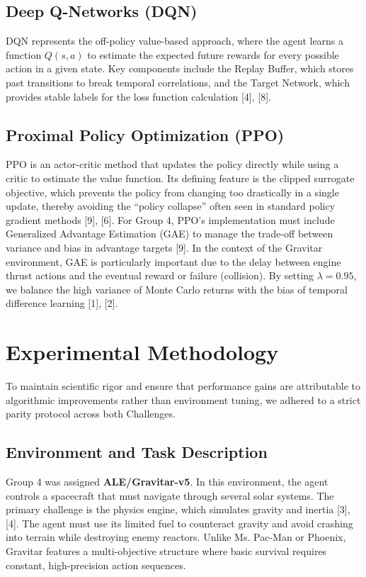 \documentclass[conference]{IEEEtran}
\begin{document}
\subsection{Deep Q-Networks (DQN)}
DQN represents the off-policy value-based approach, where the agent learns a function $Q(s, a)$ to estimate the expected future rewards for every possible action in a given state.
Key components include the Replay Buffer, which stores past transitions to break temporal correlations, and the Target Network, which provides stable labels for the loss function calculation [4], [8].

\subsection{Proximal Policy Optimization (PPO)}
PPO is an actor-critic method that updates the policy directly while using a critic to estimate the value function.
Its defining feature is the clipped surrogate objective, which prevents the policy from changing too drastically in a single update, thereby avoiding the ``policy collapse'' often seen in standard policy gradient methods [9], [6].
For Group 4, PPO’s implementation must include Generalized Advantage Estimation (GAE) to manage the trade-off between variance and bias in advantage targets [9].
In the context of the Gravitar environment, GAE is particularly important due to the delay between engine thrust actions and the eventual reward or failure (collision).
By setting $\lambda = 0.95$, we balance the high variance of Monte Carlo returns with the bias of temporal difference learning [1], [2].

\section{Experimental Methodology}
To maintain scientific rigor and ensure that performance gains are attributable to algorithmic improvements rather than environment tuning, we adhered to a strict parity protocol across both Challenges.

\subsection{Environment and Task Description}
Group 4 was assigned \textbf{ALE/Gravitar-v5}. In this environment, the agent controls a spacecraft that must navigate through several solar systems.
The primary challenge is the physics engine, which simulates gravity and inertia [3], [4].
The agent must use its limited fuel to counteract gravity and avoid crashing into terrain while destroying enemy reactors.
Unlike Ms. Pac-Man or Phoenix, Gravitar features a multi-objective structure where basic survival requires constant, high-precision action sequences.
\end{document}
